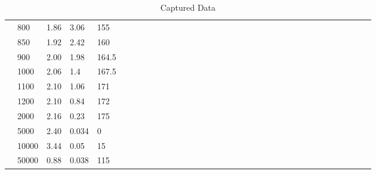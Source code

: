 \documentclass[10pt,twocolumn]{article}
\begin{document}
\begin{table}
\begin{tabularx}{1\linewidth}{ lXXXX|cXXXXXXXXXXXXXXXXXXXXXXXXXXXXX }
		\cline{1-5}
		& 800 & 1.86 & 3.06 & 155 \\
	
		\cline{1-5}
		& 850 & 1.92 & 2.42 & 160 \\
		
		\cline{1-5}
		& 900 & 2.00 & 1.98 & 164.5 \\
		
		\cline{1-5}
		& 1000 & 2.06 & 1.4 & 167.5 \\
		
		\cline{1-5}
		& 1100 & 2.10 & 1.06 & 171 \\
		
		\cline{1-5}
		& 1200 & 2.10 & 0.84 & 172 \\
		
		\cline{1-5}
		& 2000 & 2.16 & 0.23 & 175 \\
		
		\cline{1-5}
		& 5000 & 2.40 & 0.034 & 0 \\
		
		\cline{1-5}
		& 10000 & 3.44 & 0.05 & 15 \\
		
		\cline{1-5}
		& 50000 & 0.88 & 0.038 & 115 \\
		
		\cline{1-5}
		
		\hline
	\end{tabularx}
	\caption{Captured Data}
	\label{tab:Tab2}
\end{table}
\end{document}
